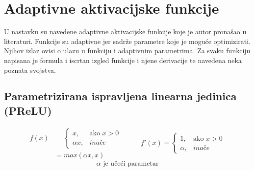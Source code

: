 \documentclass[times, utf8, numeric, diplomski]{fer}
\def\otherwise{\textit{inače}}
\def\TODO#1{\noindent\textcolor{red}{TODO: \textit{#1}}\newline}
\def\todo#1{\TODO{#1}}
\def\todoimg#1{\begin{center} \textcolor{red}{\big[ IMAGE: \textit{#1} \big]} \end{center}}
\begin{document}
%

\iffalse %
\section{Adaptivne aktivacijske funkcije}
U nastavku su navedene adaptivne aktivacijske funkcije koje je autor pronašao u literaturi. Funkcije su adaptivne jer sadrže parametre koje je moguće optimizirati. Njihov izlaz ovisi o ulazu u funkciju i adaptivnim parametrima. Za svaku funkciju napisana je formula i iscrtan izgled funkcije i njene derivacije te navedena neka poznata svojstva.

\subsection{Parametrizirana ispravljena linearna jedinica (PReLU)}

\todoimg{}

\begin{equation}
\begin{split}
f(x) &= \begin{cases}
x,			& \text{ako } x > 0 \\
\alpha x,	& \otherwise
\end{cases} \\
&= max(\alpha x, x)
\end{split}
\qquad
\begin{split}
f'(x) = 
\begin{cases}
1,		& \text{ako } x > 0 \\
\alpha,	& \otherwise
\end{cases}
\end{split}
\end{equation}
\begin{equation*}
\alpha \text{ je učeći parametar}
\end{equation*}
\end{document}
